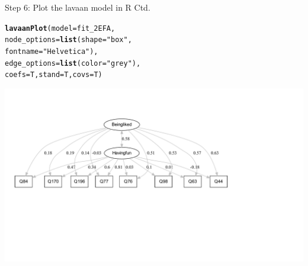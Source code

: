 \documentclass[10pt]{beamer}\usepackage[]{graphicx}\usepackage[]{xcolor}
\makeatletter
\def\maxwidth{ %
  \ifdim\Gin@nat@width>\linewidth
    \linewidth
  \else
    \Gin@nat@width
  \fi
}
\newcommand{\hlstr}[1]{\textcolor[rgb]{0.192,0.494,0.8}{#1}}%
\newcommand{\hlstd}[1]{\textcolor[rgb]{0.345,0.345,0.345}{#1}}%
\newcommand{\hlkwc}[1]{\textcolor[rgb]{0.333,0.667,0.333}{#1}}%
\newcommand{\hlkwd}[1]{\textcolor[rgb]{0.737,0.353,0.396}{\textbf{#1}}}%
\newenvironment{kframe}{%
 \def\at@end@of@kframe{}%
 \ifinner\ifhmode%
  \def\at@end@of@kframe{\end{minipage}}%
  \begin{minipage}{\columnwidth}%
 \fi\fi%
 \def\FrameCommand##1{\hskip\@totalleftmargin \hskip-\fboxsep
 \colorbox{shadecolor}{##1}\hskip-\fboxsep
     \hskip-\linewidth \hskip-\@totalleftmargin \hskip\columnwidth}%
 \MakeFramed {\advance\hsize-\width
   \@totalleftmargin\z@ \linewidth\hsize
   \@setminipage}}%
 {\par\unskip\endMakeFramed%
 \at@end@of@kframe}
\newenvironment{knitrout}{}{} %
\makeatother
\begin{document}
\begin{frame}[fragile]{Step 6: Plot the lavaan model in R Ctd.}

\begin{knitrout}
\color{fgcolor}\begin{kframe}
\begin{alltt}
\hlkwd{lavaanPlot}\hlstd{(}\hlkwc{model} \hlstd{= fit_2EFA,}
           \hlkwc{node_options} \hlstd{=} \hlkwd{list}\hlstd{(}\hlkwc{shape} \hlstd{=} \hlstr{"box"}\hlstd{,}
                               \hlkwc{fontname} \hlstd{=} \hlstr{"Helvetica"}\hlstd{),}
           \hlkwc{edge_options} \hlstd{=} \hlkwd{list}\hlstd{(}\hlkwc{color} \hlstd{=} \hlstr{"grey"}\hlstd{),}
           \hlkwc{coefs} \hlstd{= T,} \hlkwc{stand} \hlstd{= T,} \hlkwc{covs} \hlstd{= T)}
\end{alltt}
\end{kframe}
\includegraphics[width=\maxwidth]{figure/unnamed-chunk-8-1} 
\end{knitrout}
\end{frame}
%
\end{document}

